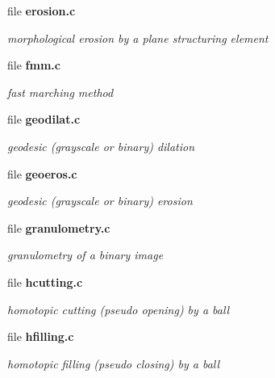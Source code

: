 \begin{DoxyCompactItemize}
\item 
file {\bf erosion.c}


\begin{DoxyCompactList}\small\item\em morphological erosion by a plane structuring element \item\end{DoxyCompactList}

\item 
file {\bf fmm.c}


\begin{DoxyCompactList}\small\item\em fast marching method \item\end{DoxyCompactList}

\item 
file {\bf geodilat.c}


\begin{DoxyCompactList}\small\item\em geodesic (grayscale or binary) dilation \item\end{DoxyCompactList}

\item 
file {\bf geoeros.c}


\begin{DoxyCompactList}\small\item\em geodesic (grayscale or binary) erosion \item\end{DoxyCompactList}

\item 
file {\bf granulometry.c}


\begin{DoxyCompactList}\small\item\em granulometry of a binary image \item\end{DoxyCompactList}

\item 
file {\bf hcutting.c}


\begin{DoxyCompactList}\small\item\em homotopic cutting (pseudo opening) by a ball \item\end{DoxyCompactList}

\item 
file {\bf hfilling.c}


\begin{DoxyCompactList}\small\item\em homotopic filling (pseudo closing) by a ball \item\end{DoxyCompactList}


\end{DoxyCompactItemize}

